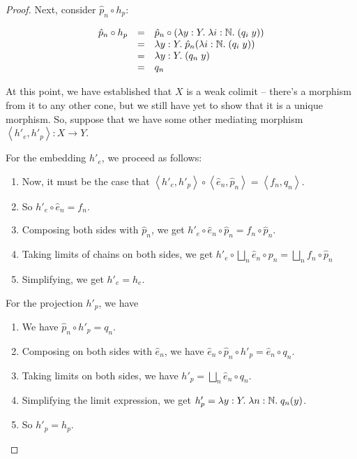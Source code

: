 \begin{proof}
Next, consider $\hat{p}_n \circ h_p$: 

\begin{displaymath}
\begin{array}{lcl}
   \hat{p}_n \circ h_p
   & = & 
     \hat{p}_n \circ (\lambda y:Y.\;\lambda i:\mathbb{N}.\;(q_i\;y))
\\
   & = & 
     \lambda y:Y.\; \hat{p}_n (\lambda i:\mathbb{N}.\;(q_i\;y))
\\
   & = & 
     \lambda y:Y.\; (q_n\;y)
\\
   & = & 
     q_n 
\\
\end{array}
\end{displaymath}

At this point, we have established that $X$ is a weak colimit --
there's a morphism from it to any other cone, but we still have yet to
show that it is a unique morphism. So, suppose that we have some 
other mediating morphism $\left<h'_e, h'_p\right> : X \to Y$. 

For the embedding $h'_e$, we proceed as follows:

\begin{enumerate}
\item Now, 
it must be the case that $\left<h'_e, h'_p\right> \circ \left<\hat{e}_n, \hat{p}_n\right> = 
\left<f_n, q_n\right>$. 

\item So $h'_e \circ \hat{e}_n = f_n$. 

\item Composing both sides with $\hat{p}_n$, we get 
   $h'_e \circ \hat{e}_n \circ \hat{p}_n = f_n \circ \hat{p}_n$. 

\item Taking limits of chains on both sides, we get $h'_e \circ \bigsqcup_n \hat{e}_n \circ{p}_n = \bigsqcup_n f_n \circ \hat{p}_n$

\item Simplifying, we get $h'_e = h_e$.
\end{enumerate}

For the projection $h'_p$, we have

\begin{enumerate}
\item We have $\hat{p}_n \circ h'_p = q_n$. 
\item Composing on both sides with $\hat{e}_n$, we have $\hat{e}_n \circ \hat{p}_n \circ h'_p = \hat{e}_n \circ q_n$. 
\item Taking limits on both sides, we have $h'_p = \bigsqcup_n \hat{e}_n \circ q_n$. 
\item Simplifying the limit expression, we get $h'_p = \lambda y:Y.\;\lambda n:\mathbb{N}.\; q_n(y)$. 
\item So $h'_p = h_p$. 
\end{enumerate}

\end{proof}


